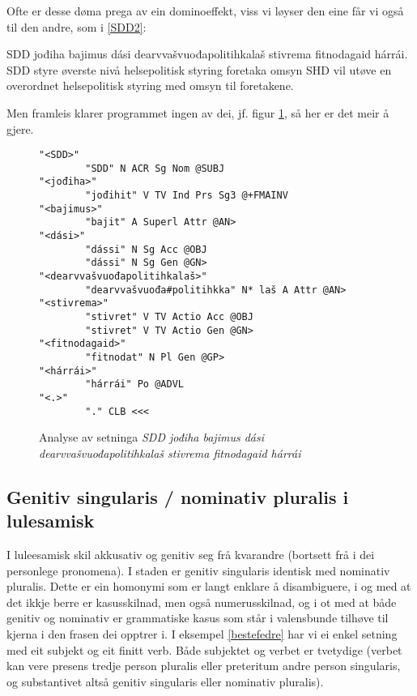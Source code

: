 \documentclass[a4paper,nynorsk]{article}
\begin{document}
Ofte er desse døma prega av ein dominoeffekt, viss vi løyser den eine får vi også til den andre, som i \ref{SDD2}: %

\begin{example}\label{SDD2}
\gll SDD jođiha bajimus dási dearvvašvuođapolitihkalaš stivrema fitnodagaid hárrái.
      SDD styre øverste nivå helsepolitisk styring foretaka omsyn
\glt      SHD vil utøve en overordnet helsepolitisk styring med omsyn til foretakene.
\glend
\end{example}

Men framleis klarer programmet ingen av dei, jf. figur \ref{SDD2-a}, så her er det meir å gjere. %

\begin{figure}[htbp]
\begin{center}
\begin{verbatim}
"<SDD>"
        "SDD" N ACR Sg Nom @SUBJ
"<jođiha>"
        "jođihit" V TV Ind Prs Sg3 @+FMAINV
"<bajimus>"
        "bajit" A Superl Attr @AN>
"<dási>"
        "dássi" N Sg Acc @OBJ
        "dássi" N Sg Gen @GN>
"<dearvvašvuođapolitihkalaš>"
        "dearvvašvuođa#politihkka" N* laš A Attr @AN>
"<stivrema>"
        "stivret" V TV Actio Acc @OBJ
        "stivret" V TV Actio Gen @GN>
"<fitnodagaid>"
        "fitnodat" N Pl Gen @GP>
"<hárrái>"
        "hárrái" Po @ADVL
"<.>"
        "." CLB <<<
\end{verbatim}
\caption{Analyse av setninga \textit{SDD jođiha bajimus dási dearvvašvuođapolitihkalaš stivrema fitnodagaid hárrái}}
\label{SDD2-a}
\end{center}
\end{figure}



\subsection{Genitiv singularis / nominativ pluralis i lulesamisk}

I luleesamisk skil akkusativ og genitiv seg frå kvarandre (bortsett frå i dei personlege pronomena). I staden er genitiv singularis identisk med nominativ pluralis. Dette er ein homonymi som er langt enklare å disambiguere, i og med at det ikkje berre er kasusskilnad, men også numerusskilnad, og i ot med at både genitiv og nominativ er  grammatiske kasus som står i valensbunde tilhøve til kjerna i den frasen dei opptrer i. I eksempel \ref{bestefedre} har vi ei enkel setning med eit subjekt og eit finitt verb. Både subjektet og verbet er tvetydige (verbet kan vere presens tredje person pluralis eller preteritum andre person singularis, og substantivet altså genitiv singularis eller nominativ pluralis). %
\end{document}
